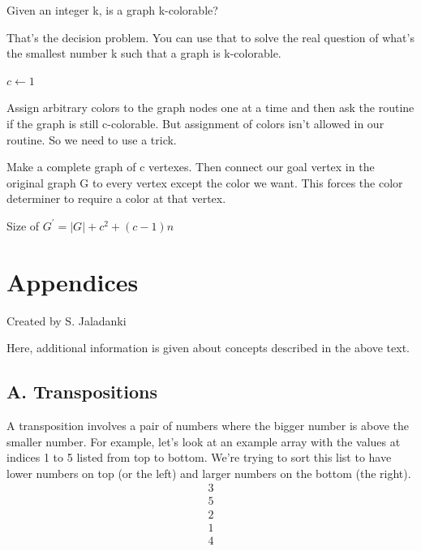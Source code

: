\documentclass[english, 10pt]{article}
\begin{document}
Given an integer k, is a graph k-colorable?

That's the decision problem. You can use that to solve the real question of
what's the smallest number k such that a graph is k-colorable.

\begin{algorithm}[H]
    $c\gets 1$\;
\end{algorithm}

    Assign arbitrary colors to the graph nodes one at a time and then ask the
    routine if the graph is still c-colorable. But assignment of colors isn't
    allowed in our routine. So we need to use a trick.

    Make a complete graph of c vertexes. Then connect our goal vertex in the
    original graph G to every vertex except the color we want. This forces the
    color determiner to require a color at that vertex.

    Size of $G^{\prime} = |G|+ c^2 +(c-1)n$

\newpage

\section{Appendices}

Created by S. Jaladanki

Here, additional information is given about concepts described in the above text.

\subsection{A. Transpositions}

A transposition involves a pair of numbers where the bigger number is above the smaller number. 
\newline
\newline
For example, let's look at an example array with the values at indices 1 to 5 listed from top to bottom. We're trying to sort this list to have lower numbers on top (or the left) and larger numbers on the bottom (the right).
\newline
\begin{align*}
    3 \\
    5 \\
    2 \\
    1 \\
    4
\end{align*}
\end{document}
